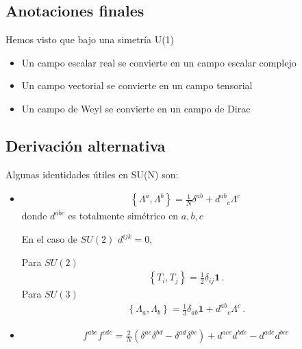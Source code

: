 \subsection{Anotaciones finales}


Hemos visto que bajo una simetría U(1)
\begin{itemize}
 \item Un campo escalar real se convierte en un campo escalar complejo
\item Un campo vectorial se convierte en un campo tensorial
\item Un campo de Weyl se convierte en un campo de Dirac
\end{itemize}




\subsection{Derivación alternativa}







Algunas identidades útiles en SU(N) son:

\begin{itemize}
\item 
\begin{align}
  \left\{ \Lambda^{a},\Lambda^{b} \right\}=\frac{1}{N}\delta^{ab}+{d^{ab}}_c \Lambda^{c}\,
\end{align}
donde $d^{abc}$ es totalmente simétrico en $a,b,c$

 En el caso de $SU(2)$ $d^{ijk}=0$, 

Para  $SU(2)$
\begin{align}
\left\{T_i,T_j\right\}=\frac{1}{2}\delta_{ij}\mathbf{1}\,.
\end{align}
Para  $SU(3)$
\begin{align}
\left\{\Lambda_a,\Lambda_b\right\}=\frac{1}{3}\delta_{ab}\mathbf{1}+{d^{ab}}_c \Lambda^{c}\,.
\end{align}

\item 
\begin{align}
  f^{abe}f^{cde}=\frac{2}{N}(\delta^{ac}\delta^{bd}-
 \delta^{ad}\delta^{bc})+d^{ace}d^{bde}-d^{ade}d^{bce}
\end{align}
\end{itemize}



